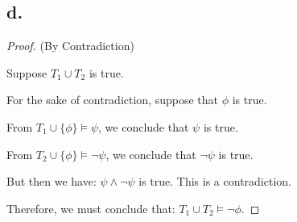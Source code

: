 \documentclass{article}
\begin{document}
\subsection*{d.}
\begin{proof}(By Contradiction)
  $ $

  Suppose $T_1 \cup T_2$ is true.

  For the sake of contradiction, suppose that $\phi$ is true.

  From $T_1 \cup \{ \phi \} \models \psi$, we conclude that $\psi$ is true.

  From $T_2 \cup \{ \phi \} \models \lnot \psi$, we conclude that $\lnot \psi$ is true.

  But then we have: $\psi \land \lnot \psi$ is true. This is a contradiction.

  Therefore, we must conclude that: $T_1 \cup T_2 \models \lnot \phi$.

\end{proof}
\end{document}
